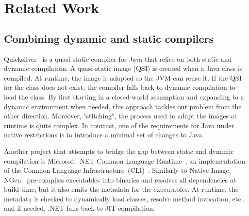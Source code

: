 \chapter{Related Work}


\section{Combining dynamic and static compilers}
Quicksilver~\cite{serrano_quicksilver_2000} is a quasi-static compiler for Java that relies on both static and dynamic compilation. 
A quasi-static image (QSI) is created when a Java class is compiled. At runtime, the image is adapted so the JVM can reuse it. If the QSI for the class does not exist, the compiler falls back to dynamic compilation to load the class. 
By first starting in a closed-world assumption and expanding to a dynamic environment when needed, this approach tackles our problem from the other direction.
Moreover, "stitching", the process used to adapt the images at runtime is quite complex. In contrast, one of the requirements for Java under native restrictions is to introduce a minimal set of changes to Java.

Another project that attempts to bridge the gap between static and dynamic compilation is Microsoft .NET Common Language Runtime~\cite{noauthor_common_2023}, an implementation of the Common Language Infrastructure~(CLI)~\cite{noauthor_common_2012}. 
Similarly to Native Image, NGen~\cite{noauthor_clr_2019} pre-compiles executables into binaries and resolves all dependencies at build time, but it also emits the metadata for the executables. At runtime, the metadata is checked to dynamically load classes, resolve method invocation, etc., and if needed, .NET falls back to JIT compilation.

